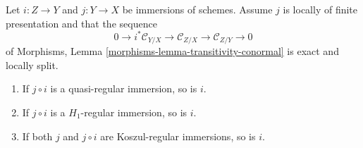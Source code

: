\begin{lemma}
\label{lemma-permanence-regular-immersion}
Let $i : Z \to Y$ and $j : Y \to X$ be immersions of schemes. Assume
$j$ is locally of finite presentation and that the sequence
$$
0 \to i^*\mathcal{C}_{Y/X} \to
\mathcal{C}_{Z/X} \to
\mathcal{C}_{Z/Y} \to 0
$$
of
Morphisms, Lemma \ref{morphisms-lemma-transitivity-conormal}
is exact and locally split.
\begin{enumerate}
\item If $j \circ i$ is a quasi-regular immersion, so is $i$.
\item If $j \circ i$ is a $H_1$-regular immersion, so is $i$.
\item If both $j$ and $j \circ i$ are Koszul-regular immersions, so is $i$.
\end{enumerate}
\end{lemma}

